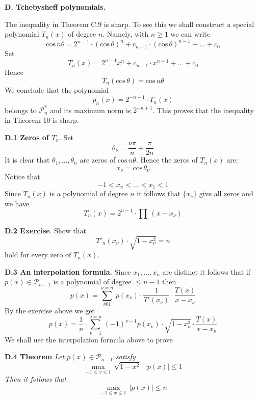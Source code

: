 \documentclass{amsart}
\begin{document}
{\centerline{\bf{D. Tchebysheff polynomials.}}
\medskip

\noindent
The inequality in Theorem C.9 is sharp. To see this
we shall construct a special polynomial $T_n(x)$ of degree $n$.
Namely, with $n\geq 1$ we can write
\[
\text{cos}\,n\theta=
2^{n-1}\cdot 
(\text{cos}\,\theta)^n+
c_{n-1}\cdot 
(\text{cos}\,\theta)^{n-1}+
\ldots+c_0
\]
Set
\[ T_n(x) =2^{n-1}x^n+
c_{n-1}\cdot x^{n-1}+\ldots+c_0
\]
Hence
\[ 
T_n(\text{cos}\,\theta)= \text{cos}\, n\theta
\]
We conclude that the polynomial
\[ 
p_n(x)=2^{-n+1}\cdot T_n(x)
\]
belongs to $\mathcal P_n^*$ and its maximum norm
is $2^{-n+1}$. This proves that the inequality in Theorem 10 is sharp.
\medskip

\noindent
{\bf D.1 Zeros of $T_n$}.
Set
\[ 
\theta_\nu=\frac{\nu\pi}{n}+\frac{\pi}{2n}
\]
It is clear that
$\theta_1,\dots,\theta_n$ are zeros of
$\text{cos}\, n\theta$.
Hence the  zeros of $T_n(x)$ are:
\[
x_\nu= \text{cos}\, \theta_\nu
\]
Notice that
\[
-1<x_n<\ldots<x_1<1
\]
Since $T_n(x)$ is a polynomial of degree
$n$ it follows that $\{x_\nu\}$ give all zeros and we have
\[
T_n(x)=2^{n-1}\cdot \prod\,(x-x_\nu)
\]


\noindent
{\bf{D.2 Exercise}}.
Show that
\[ 
T'_n(x_\nu)\cdot\sqrt{1-x_\nu^2}=n
\] 
hold for every zero of $T_n(x)$.

\medskip

\noindent
{\bf{D.3 An interpolation formula.}}
Since $x_1,\ldots,x_n$ are distinct it follows 
that if $p(x)\in\mathcal P_{n-1}$ is a polynomial of degree
$\leq n-1$ then
\[
 p(x)=
\sum_{\nu01}^{\nu=n}\, p(x_\nu)\cdot
\frac{1}{T'(x_\nu)}\cdot \frac{T(x)}{x-x_\nu}
\]
By the exercise above we get
\[
 p(x)=
\frac{1}{n}\cdot \sum_{\nu=1}^{\nu=n}\, (-1)^{\nu-1}p(x_\nu)\cdot
\sqrt{1-x_\nu^2}\cdot \frac{T(x)}{x-x_\nu}
\]
\medskip
\noindent
We shall use the interpolation formula above to prove
\medskip

\noindent
{\bf {D.4 Theorem}}
\emph{Let $p(x)\in\mathcal P_{n-1}$ satisfy}
\[
\max_{-1\leq x\leq 1}\,
\sqrt{1-x^2}\cdot |p(x)|\leq 1\tag{1}
\]
\emph{Then it follows that}
\[
\max_{-1\leq x\leq 1}\,
|p(x)|\leq n\tag{2}
\]
\medskip

}
\end{document}
